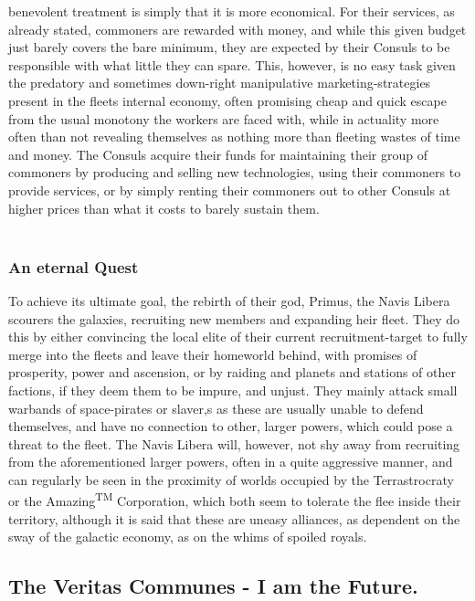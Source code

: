 \documentclass[a4paper,12pt]{report}
\begin{document}
benevolent treatment is simply that it is more economical. For their services, as already stated, commoners are rewarded with money, and while this given budget just barely covers the bare minimum, they are expected by their Consuls to be responsible with what little they can spare. This, however, is no easy task given the predatory and sometimes down-right manipulative marketing-strategies present in the fleets internal economy, often promising cheap and quick escape from the usual monotony the workers are faced with, while in actuality more often than not revealing themselves as nothing more than fleeting wastes of time and money. The Consuls acquire their funds for maintaining their group of commoners by producing and selling new technologies, using their commoners to provide services, or by simply renting their commoners out to other Consuls at higher prices than what it costs to barely sustain them.\\
\\
\subsubsection*{An eternal Quest}
To achieve its ultimate goal, the rebirth of their god, Primus, the Navis Libera scourers the galaxies, recruiting new members and expanding heir fleet. They do this by either convincing the local elite of their current recruitment-target to fully merge into the fleets and leave their homeworld behind, with promises of prosperity, power and ascension, or by raiding and  planets and stations of other factions, if they deem them to be impure, and unjust. They mainly attack small warbands of space-pirates or slaver,s as these are usually unable to defend themselves, and have no connection to other, larger powers, which could pose a threat to the fleet. The Navis Libera will, however, not shy away from recruiting from the aforementioned larger powers, often in a quite aggressive manner, and can regularly be seen in the proximity of worlds occupied by the Terrastrocraty or the Amazing\textsuperscript{TM} Corporation, which both seem to tolerate the flee inside their territory, although it is said that these are uneasy alliances, as dependent on the sway of the galactic economy, as on the whims of spoiled royals.  

\subsection{The  Veritas Communes - I am the Future. }
\end{document}
